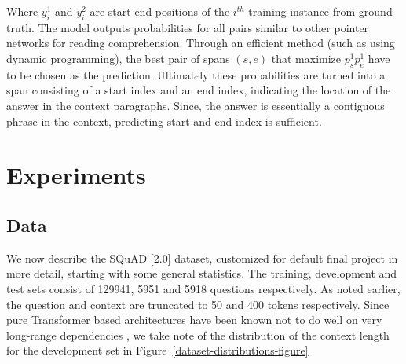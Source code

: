 \documentclass{article}
\begin{document}
\begin{enumerate}
Where $y_i^1$ and $y_i^2$ are start end positions of the $i^{{th}}$  training instance from ground truth. The model outputs probabilities for all pairs similar to other pointer networks for reading comprehension. Through an efficient method (such as using dynamic programming), the best pair of spans $(s,e)$ that maximize $p_s^1 p_e^1$ have to be chosen as the prediction. Ultimately these probabilities are turned into a span consisting of a start index and an end index, indicating the location of the answer in the context paragraphs. Since, the answer is essentially a contiguous phrase in the context, predicting start and end index is sufficient. 
\end{enumerate}	


\section{Experiments}

\subsection{Data}
We now describe the SQuAD [2.0] dataset\cite{rajpurkar2018know}, customized for default final project in more detail, starting with some general statistics. The training, development and test sets consist of 129941, 5951 and 5918 questions respectively. As noted earlier, the question and context are truncated to 50 and 400 tokens respectively. 
Since pure Transformer based architectures have been known not to do well on very long-range dependencies \cite{dai2019transformerxl}, we take note of the distribution of the context length for the development set in Figure~\ref{dataset-distributions-figure}
\end{document}
